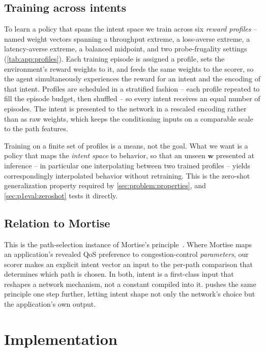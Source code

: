 \subsection{Training across intents}
To learn a policy that spans the intent space we train across six \emph{reward profiles} -- named
weight vectors spanning a throughput extreme, a loss-averse extreme, a latency-averse extreme, a balanced
midpoint, and two probe-frugality settings (\cref{tab:app:profiles}). Each training episode is assigned a
profile, sets the environment's reward weights to it, and feeds the same weights to the scorer, so the
agent simultaneously experiences the reward for an intent and the encoding of that intent. Profiles are
scheduled in a stratified fashion -- each profile repeated to fill the episode budget, then shuffled --
so every intent receives an equal number of episodes. The intent is presented to the network in a
rescaled encoding rather than as raw weights, which keeps the conditioning inputs on a comparable scale
to the path features.

Training on a finite set of profiles is a means, not the goal. What we want is a policy that maps the
\emph{intent space} to behavior, so that an unseen $\mathbf{w}$ presented at inference -- in particular
one interpolating between two trained profiles -- yields correspondingly interpolated behavior without
retraining. This is the zero-shot generalization property required by \cref{sec:problem:properties}, and
\cref{sec:p1eval:zeroshot} tests it directly.

\subsection{Relation to Mortise}
This is the path-selection instance of Mortise's principle~\cite{Shen2026}. Where Mortise maps an
application's revealed QoS preference to congestion-control \emph{parameters}, our scorer makes an
explicit intent vector an input to the per-path comparison that determines which path is chosen. In
both, intent is a first-class input that reshapes a network mechanism, not a constant compiled into it.
 pushes the same principle one step further, letting intent shape not only the network's
choice but the application's own output.

\section{Implementation}
\label{sec:sp:impl}

